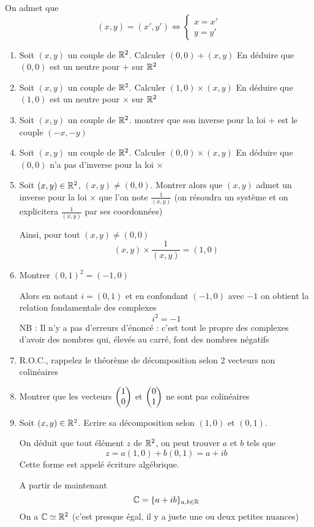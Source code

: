 On admet que $$(x,y) = (x',y') \Leftrightarrow \left\{ \begin{array}{l} x = x' \\ y = y' \end{array} \right.$$
\begin{enumerate}
\item Soit $(x,y)$ un couple de $\mathbb{R}^2$. Calculer $(0,0) + (x,y)$
En déduire que $(0,0)$ est un neutre pour $+$ sur $\mathbb{R}^2$
\item Soit $(x,y)$ un couple de $\mathbb{R}^2$. Calculer $(1,0) \times (x,y)$
En déduire que $(1,0)$ est un neutre pour $\times$ sur $\mathbb{R}^2$
\item Soit $(x,y)$ un couple de $\mathbb{R}^2$. montrer que son inverse pour la loi $+$ est le couple $(-x,-y)$
\item Soit $(x,y)$ un couple de $\mathbb{R}^2$. Calculer $(0,0) \times (x,y)$
En déduire que $(0,0)$ n'a pas d'inverse pour la loi $\times$
\item Soit $(x,y)\in \mathbb{R}^2$, $(x,y) \neq (0,0)$. Montrer alors que $(x,y)$ admet un inverse pour la loi $\times$ que l'on note $\frac{1}{(x,y)}$ (on résoudra un système et on explicitera $\frac{1}{(x,y)}$ par ses coordonnées)\newline

Ainsi, pour tout $(x,y) \neq (0,0)$
$$\boxed{(x,y) \times \frac{1}{(x,y)} = (1,0)}$$
\item Montrer $(0,1)^2 = (-1,0)$\newline

Alors en notant $i = (0,1)$ et en confondant $(-1,0)$ avec $-1$ on obtient la relation fondamentale des complexes 
$$\boxed{i^2 = -1}$$
NB : Il n'y a pas d'erreurs d'énoncé : c'est tout le propre des complexes d'avoir des nombres qui, élevés au carré, font des nombres négatifs
\item R.O.C., rappelez le théorème de décomposition selon 2 vecteurs non colinéaires
\item Montrer que les vecteurs $\begin{pmatrix}1 \\0 \end{pmatrix}$ et $\begin{pmatrix}0 \\1 \end{pmatrix}$ ne sont pas colinéaires
\item Soit $(x,y)\in \mathbb{R}^2$. Ecrire sa décomposition selon $(1,0)$ et $(0,1)$.\newline

On déduit que tout élément $z$ de $\mathbb{R}^2$, on peut trouver $a$ et $b$ tels que 
$$z = a(1,0) + b(0,1) = a + ib$$
Cette forme est appelé écriture algébrique.\newline

A partir de maintenant 
$$\mathbb{C} = \{a+ib\}_{a,b\in\mathbb{R}}$$
On a $\mathbb{C} \simeq \mathbb{R}^2$ (c'est presque égal, il y a juste une ou deux petites nuances)\newline


\end{enumerate}
